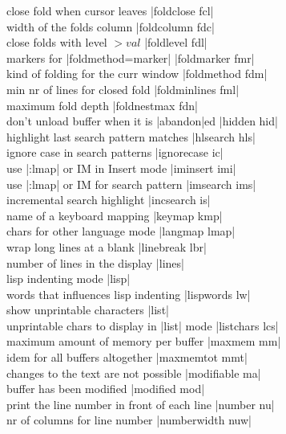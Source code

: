 \documentclass[10pt,a4paper,landscape]{article}
\begin{document}
\begin{multicols}{4}
close fold when cursor leaves			\dotfill|foldclose fcl|\\
width of the folds column			\dotfill|foldcolumn fdc|\\
close folds with level $> val$			\dotfill|foldlevel fdl|\\
markers for |foldmethod=marker|			\dotfill|foldmarker fmr|\\
kind of folding for the curr window		\dotfill|foldmethod fdm|\\
min nr of lines for closed fold			\dotfill|foldminlines fml|\\
maximum fold depth				\dotfill|foldnestmax fdn|\\
don't unload buffer when it is |abandon|ed	\dotfill|hidden hid|\\
highlight last search pattern matches		\dotfill|hlsearch hls|\\
ignore case in search patterns			\dotfill|ignorecase ic|\\
use |:lmap| or IM in Insert mode		\dotfill|iminsert imi|\\
use |:lmap| or IM for search pattern		\dotfill|imsearch ims|\\
incremental search highlight			\dotfill|incsearch is|\\
name of a keyboard mapping			\dotfill|keymap kmp|\\
chars for other language mode			\dotfill|langmap lmap|\\
wrap long lines at a blank			\dotfill|linebreak lbr|\\
number of lines in the display			\dotfill|lines|\\
lisp indenting mode				\dotfill|lisp|\\
words that influences lisp indenting		\dotfill|lispwords lw|\\
show unprintable characters			\dotfill|list|\\
unprintable chars to display in |list| mode	\dotfill|listchars lcs|\\
maximum amount of memory per buffer		\dotfill|maxmem mm|\\
idem for all buffers altogether			\dotfill|maxmemtot mmt|\\
changes to the text are not possible		\dotfill|modifiable ma|\\
buffer has been modified			\dotfill|modified mod|\\
print the line number in front of each line	\dotfill|number nu|\\
nr of columns for line number			\dotfill|numberwidth nuw|\\

\end{multicols}
\end{document}
